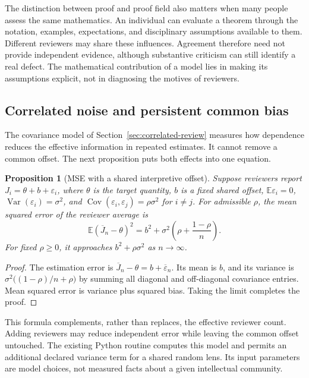 \documentclass[11pt,oneside]{article}
\theoremstyle{komorebiplain}
\newtheorem{proposition}[theorem]{Proposition}
\theoremstyle{komorebidefinition}
\theoremstyle{komorebiremark}
\begin{document}
The distinction between proof and proof field also matters when many people assess the same mathematics. An individual can evaluate a theorem through the notation, examples, expectations, and disciplinary assumptions available to them. Different reviewers may share these influences. Agreement therefore need not provide independent evidence, although substantive criticism can still identify a real defect. The mathematical contribution of a model lies in making its assumptions explicit, not in diagnosing the motives of reviewers.

\subsection{Correlated noise and persistent common bias}

The covariance model of Section~\ref{sec:correlated-review} measures how dependence reduces the effective information in repeated estimates. It cannot remove a common offset. The next proposition puts both effects into one equation.

\begin{proposition}[MSE with a shared interpretive offset]
\label{res:25:1}
Suppose reviewers report $J_i=\theta+b+\varepsilon_i$, where $\theta$ is the target quantity, $b$ is a fixed shared offset, $\mathbb E\varepsilon_i=0$, $\operatorname{Var}(\varepsilon_i)=\sigma^2$, and $\operatorname{Cov}(\varepsilon_i,\varepsilon_j)=\rho\sigma^2$ for $i\ne j$. For admissible $\rho$, the mean squared error of the reviewer average is
\[
\boxed{\mathbb E(\overline J_n-\theta)^2=b^2+\sigma^2\left(\rho+\frac{1-\rho}{n}\right).}
\]
For fixed $\rho\ge0$, it approaches $b^2+\rho\sigma^2$ as $n\to\infty$.
\end{proposition}
\begin{proof}
The estimation error is $\overline J_n-\theta=b+\overline\varepsilon_n$. Its mean is $b$, and its variance is $\sigma^2\big((1-\rho)/n+\rho\big)$ by summing all diagonal and off-diagonal covariance entries. Mean squared error is variance plus squared bias. Taking the limit completes the proof.
\end{proof}

This formula complements, rather than replaces, the effective reviewer count. Adding reviewers may reduce independent error while leaving the common offset untouched. The existing Python routine  computes this model and permits an additional declared variance term for a shared random lens. Its input parameters are model choices, not measured facts about a given intellectual community.
\end{document}
